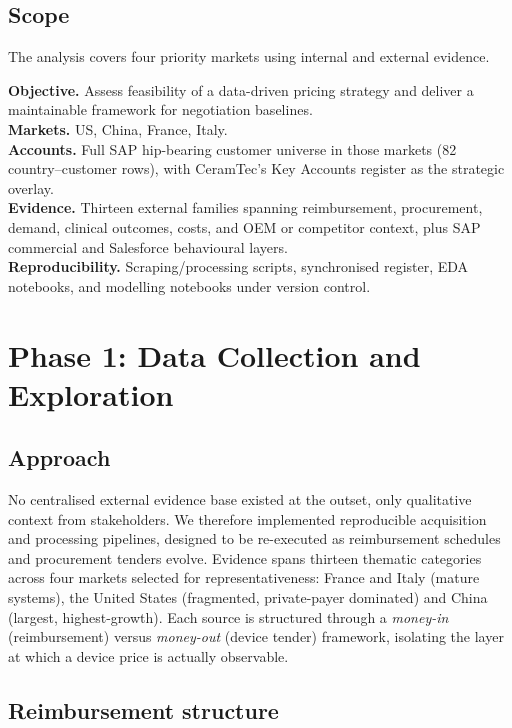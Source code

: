 \documentclass{article}
\begin{document}
\subsection{Scope}
The analysis covers four priority markets using internal and external evidence.

\textbf{Objective.} Assess feasibility of a data-driven pricing strategy and deliver a maintainable framework for negotiation baselines.\\
\textbf{Markets.} US, China, France, Italy.\\
\textbf{Accounts.} Full SAP hip-bearing customer universe in those markets (82 country--customer rows), with CeramTec's Key Accounts register as the strategic overlay.\\
\textbf{Evidence.} Thirteen external families spanning reimbursement, procurement, demand, clinical outcomes, costs, and OEM or competitor context, plus SAP commercial and Salesforce behavioural layers.\\
\textbf{Reproducibility.} Scraping/processing scripts, synchronised register, EDA notebooks, and modelling notebooks under version control.

\clearpage

\section{Phase 1: Data Collection and Exploration}
\label{sec:external-data}

\subsection{Approach}

No centralised external evidence base existed at the outset, only qualitative context from stakeholders. We therefore implemented reproducible acquisition and processing pipelines, designed to be re-executed as reimbursement schedules and procurement tenders evolve. Evidence spans thirteen thematic categories across four markets selected for representativeness: France and Italy (mature systems), the United States (fragmented, private-payer dominated) and China (largest, highest-growth). Each source is structured through a \emph{money-in} (reimbursement) versus \emph{money-out} (device tender) framework, isolating the layer at which a device price is actually observable.

\subsection{Reimbursement structure}
\end{document}
